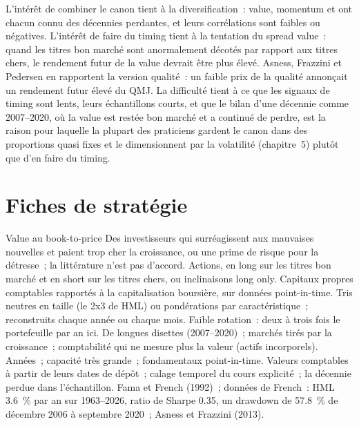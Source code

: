L'intérêt de combiner le canon tient à la diversification~: value, momentum et  ont chacun connu des décennies perdantes, et leurs corrélations sont faibles ou négatives.
L'intérêt de faire du timing tient à la tentation du spread value~: quand les titres bon marché sont anormalement décotés par rapport aux titres chers, le rendement futur de la value
devrait être plus élevé. Asness, Frazzini et Pedersen en rapportent la version qualité~: un faible prix de la qualité annonçait un rendement futur élevé du QMJ. La
difficulté tient à ce que les signaux de timing sont lents, leurs échantillons courts, et que le bilan d'une décennie comme 2007--2020, où la value est restée bon marché et a continué de perdre, est la
raison pour laquelle la plupart des praticiens gardent le canon dans des proportions quasi fixes et le dimensionnent par la volatilité (chapitre~5) plutôt que d'en faire du timing.

\section{Fiches de stratégie}

\begin{strategyfile}{Value au book-to-price}\label{strat:s1:value-quality-and-low-risk:value}
 Des investisseurs qui surréagissent aux mauvaises nouvelles et paient trop cher la croissance, ou une prime de risque pour la détresse~; la littérature n'est pas d'accord.
 Actions, en long sur les titres bon marché et en short sur les titres chers, ou inclinaisons long only.
 Capitaux propres comptables rapportés à la capitalisation boursière, sur données point-in-time.
 Tris neutres en taille (le 2x3 de HML) ou pondérations par caractéristique~; reconstruits chaque année ou chaque mois.
 Faible rotation~: deux à trois fois le portefeuille par an ici.
 De longues disettes (2007--2020)~; marchés tirés par la croissance~; comptabilité qui ne mesure plus la valeur (actifs incorporels).
 Années~; capacité très grande~; fondamentaux point-in-time.
 Valeurs comptables à partir de leurs dates de dépôt~; calage temporel du cours explicité~; la décennie perdue dans l'échantillon.
 Fama et French (1992)~; données de French~: HML 3.6~\% par an sur 1963--2026, ratio de Sharpe 0.35, un drawdown de 57.8~\% de décembre 2006 à septembre 2020~;
Asness et Frazzini (2013).
\end{strategyfile}

